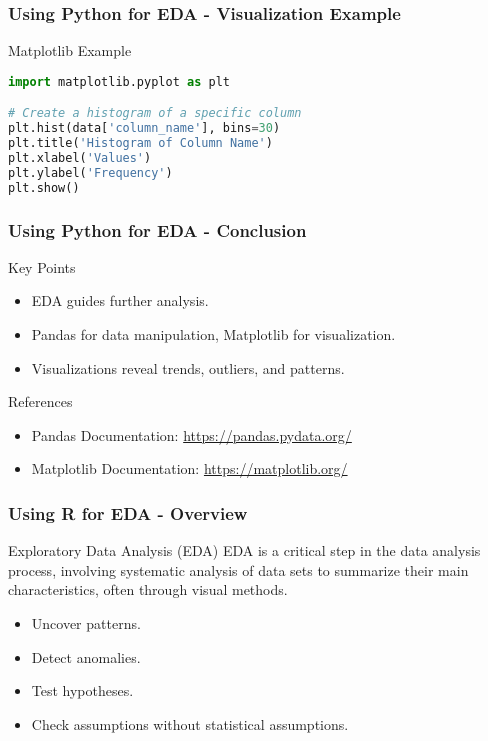\documentclass[aspectratio=169]{beamer}
\begin{document}
\begin{frame}[fragile]
    \frametitle{Using Python for EDA - Visualization Example}
    \begin{block}{Matplotlib Example}
        \begin{lstlisting}[language=Python]
import matplotlib.pyplot as plt

# Create a histogram of a specific column
plt.hist(data['column_name'], bins=30)
plt.title('Histogram of Column Name')
plt.xlabel('Values')
plt.ylabel('Frequency')
plt.show()
        \end{lstlisting}
    \end{block}
\end{frame}

\begin{frame}[fragile]
    \frametitle{Using Python for EDA - Conclusion}
    \begin{block}{Key Points}
        \begin{itemize}
            \item EDA guides further analysis.
            \item Pandas for data manipulation, Matplotlib for visualization.
            \item Visualizations reveal trends, outliers, and patterns.
        \end{itemize}
    \end{block}

    \begin{block}{References}
        \begin{itemize}
            \item Pandas Documentation: \url{https://pandas.pydata.org/}
            \item Matplotlib Documentation: \url{https://matplotlib.org/}
        \end{itemize}
    \end{block}
\end{frame}

\begin{frame}[fragile]
    \frametitle{Using R for EDA - Overview}
    \begin{block}{Exploratory Data Analysis (EDA)}
        EDA is a critical step in the data analysis process, involving systematic analysis of data sets to summarize their main characteristics, often through visual methods. 
    \end{block}
    \begin{itemize}
        \item Uncover patterns.
        \item Detect anomalies.
        \item Test hypotheses.
        \item Check assumptions without statistical assumptions.
    \end{itemize}
\end{frame}
\end{document}
